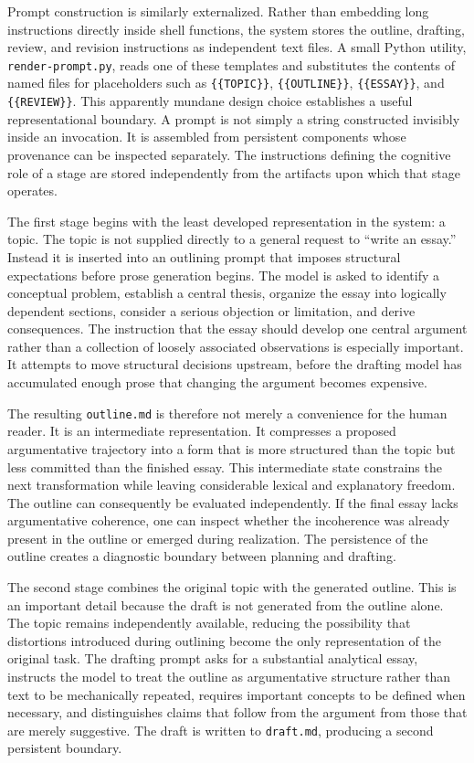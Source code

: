 \documentclass[11pt]{article}
\begin{document}
Prompt construction is similarly externalized. Rather than embedding long instructions directly inside shell functions, the system stores the outline, drafting, review, and revision instructions as independent text files. A small Python utility, \texttt{render-prompt.py}, reads one of these templates and substitutes the contents of named files for placeholders such as \texttt{\{\{TOPIC\}\}}, \texttt{\{\{OUTLINE\}\}}, \texttt{\{\{ESSAY\}\}}, and \texttt{\{\{REVIEW\}\}}. This apparently mundane design choice establishes a useful representational boundary. A prompt is not simply a string constructed invisibly inside an invocation. It is assembled from persistent components whose provenance can be inspected separately. The instructions defining the cognitive role of a stage are stored independently from the artifacts upon which that stage operates.

The first stage begins with the least developed representation in the system: a topic. The topic is not supplied directly to a general request to ``write an essay.'' Instead it is inserted into an outlining prompt that imposes structural expectations before prose generation begins. The model is asked to identify a conceptual problem, establish a central thesis, organize the essay into logically dependent sections, consider a serious objection or limitation, and derive consequences. The instruction that the essay should develop one central argument rather than a collection of loosely associated observations is especially important. It attempts to move structural decisions upstream, before the drafting model has accumulated enough prose that changing the argument becomes expensive.

The resulting \texttt{outline.md} is therefore not merely a convenience for the human reader. It is an intermediate representation. It compresses a proposed argumentative trajectory into a form that is more structured than the topic but less committed than the finished essay. This intermediate state constrains the next transformation while leaving considerable lexical and explanatory freedom. The outline can consequently be evaluated independently. If the final essay lacks argumentative coherence, one can inspect whether the incoherence was already present in the outline or emerged during realization. The persistence of the outline creates a diagnostic boundary between planning and drafting.

The second stage combines the original topic with the generated outline. This is an important detail because the draft is not generated from the outline alone. The topic remains independently available, reducing the possibility that distortions introduced during outlining become the only representation of the original task. The drafting prompt asks for a substantial analytical essay, instructs the model to treat the outline as argumentative structure rather than text to be mechanically repeated, requires important concepts to be defined when necessary, and distinguishes claims that follow from the argument from those that are merely suggestive. The draft is written to \texttt{draft.md}, producing a second persistent boundary.
\end{document}
